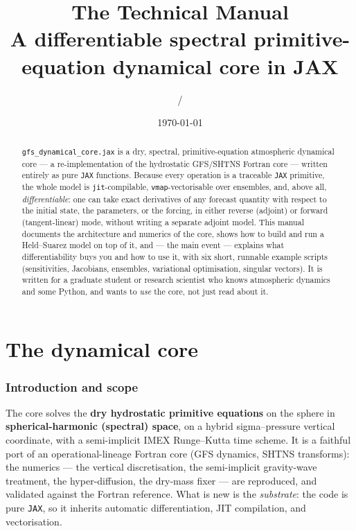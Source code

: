 \documentclass[11pt]{article}
\title{\textbf{The \code{gfs\_dynamical\_core.jax} Technical Manual}\\[4pt]
\large A differentiable spectral primitive-equation dynamical core in JAX}
\author{\code{gfs\_dynamical\_core} / \code{docs/gfs\_jax\_manual/}}
\date{\today}
\newcommand{\code}[1]{\texttt{#1}}
\begin{document}
\maketitle

\begin{abstract}
\noindent
\code{gfs\_dynamical\_core.jax} is a dry, spectral, primitive-equation atmospheric
dynamical core --- a re-implementation of the hydrostatic GFS/SHTNS Fortran core ---
written entirely as pure \code{JAX} functions. Because every operation is a
traceable \code{JAX} primitive, the whole model is \code{jit}-compilable,
\code{vmap}-vectorisable over ensembles, and, above all, \emph{differentiable}:
one can take exact derivatives of any forecast quantity with respect to the
initial state, the parameters, or the forcing, in either reverse (adjoint) or
forward (tangent-linear) mode, without writing a separate adjoint model. This
manual documents the architecture and numerics of the core, shows how to build
and run a Held--Suarez model on top of it, and --- the main event --- explains
what differentiability buys you and how to use it, with six short, runnable
example scripts (sensitivities, Jacobians, ensembles, variational optimisation,
singular vectors). It is written for a graduate student or research scientist who
knows atmospheric dynamics and some Python, and wants to \emph{use} the core, not
just read about it.
\end{abstract}

\tableofcontents
\newpage

\part{The dynamical core}

\section{Introduction and scope}

The core solves the \textbf{dry hydrostatic primitive equations} on the sphere in
\textbf{spherical-harmonic (spectral) space}, on a hybrid sigma--pressure vertical
coordinate, with a semi-implicit IMEX Runge--Kutta time scheme. It is a faithful
port of an operational-lineage Fortran core (GFS dynamics, SHTNS transforms): the
numerics --- the vertical discretisation, the semi-implicit gravity-wave treatment,
the hyper-diffusion, the dry-mass fixer --- are reproduced, and validated against
the Fortran reference. What is new is the \emph{substrate}: the code is pure
\code{JAX}, so it inherits automatic differentiation, JIT compilation, and
vectorisation.
\end{document}
